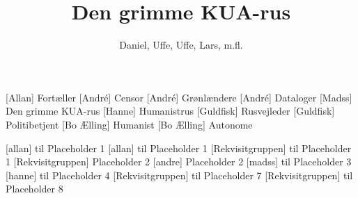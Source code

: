 \documentclass[a4paper,11pt]{article}
\title{Den grimme KUA-rus}
\author{Daniel, Uffe, Uffe, Lars, m.fl.}
\begin{document}
\maketitle

\begin{roles}
[Allan] Fortæller
[André] Censor
[André] Grønlændere
[André] Dataloger
[Madss] Den grimme KUA-rus
[Hanne] Humanistrus
[Guldfisk] Rusvejleder
[Guldfisk] Politibetjent
[Bo Ælling] Humanist
[Bo Ælling] Autonome
\end{roles}

\begin{props}
[allan] til Placeholder 1
[allan] til Placeholder 1
[Rekvisitgruppen] til Placeholder 1
[Rekvisitgruppen] Placeholder 2
[andre] Placeholder 2
[madss] til Placeholder 3 
[hanne] til Placeholder 4
[Rekvisitgruppen] til Placeholder 7
[Rekvisitgruppen] til Placeholder 8
\end{props}
\end{document}
